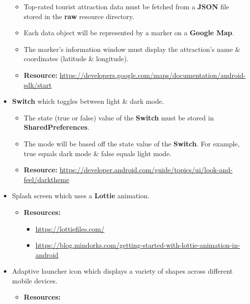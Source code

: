 \documentclass{article}
\begin{document}
\begin{itemize}
	      \begin{itemize}
		      \item Top-rated tourist attraction data must be fetched from a \textbf{JSON} file stored in the \textbf{raw} resource directory.
		      \item Each data object will be represented by a marker on a \textbf{Google Map}.
		      \item The marker's information window must display the attraction's name \& coordinates (latitude \& longitude).
		      \item \textbf{Resource:} \footnotesize\href{https://developers.google.com/maps/documentation/android-sdk/start}{https://developers.google.com/maps/documentation/android-sdk/start}
	      \end{itemize}
	\item \textbf{Switch} which toggles between light \& dark mode.
	      \begin{itemize}
		      \item The state (true or false) value of the \textbf{Switch} must be stored in \textbf{SharedPreferences}.
		      \item The mode will be based off the state value of the \textbf{Switch}. For example, true equals dark mode \& false equals light mode.
		      \item \textbf{Resource:} \footnotesize\href{https://developer.android.com/guide/topics/ui/look-and-feel/darktheme}{https://developer.android.com/guide/topics/ui/look-and-feel/darktheme}
	      \end{itemize}
	\item Splash screen which uses a \textbf{Lottie} animation.
	      \begin{itemize}
		      \item \textbf{Resources:}
		      \begin{itemize}
						\item \footnotesize\href{https://lottiefiles.com}{https://lottiefiles.com/}
						\item \footnotesize\href{https://blog.mindorks.com/getting-started-with-lottie-animation-in-android}{https://blog.mindorks.com/getting-started-with-lottie-animation-in-android}
					\end{itemize}
	      \end{itemize}
	\item Adaptive launcher icon which displays a variety of shapes across different mobile devices.
	      \begin{itemize}
		      \item \textbf{Resources:}

\end{itemize}
\end{itemize}
\end{document}
